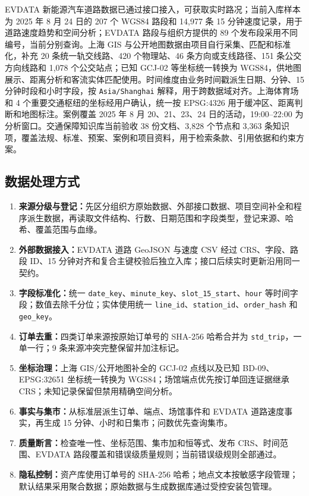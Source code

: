 \documentclass[a4paper,11pt]{article}
\newcommand{\code}[1]{\texttt{#1}}
\newcommand{\term}[1]{\textbf{#1}}
\begin{document}
EVDATA 新能源汽车道路数据已通过接口接入，可获取实时路况；当前入库样本为 2025 年 8 月 24 日的 207 个 WGS84 路段和 14,977 条 15 分钟速度记录，用于道路速度趋势和空间分析；EVDATA 路段与组织方提供的 89 个发布段采用不同编号，当前分别查询。上海 GIS 与公开地图数据由项目自行采集、匹配和标准化，补充 20 条统一轨交线路、420 个物理站、46 条方向或支线路径、151 条公交方向线路和 1,078 个公交站点；已知 GCJ-02 等坐标统一转换为 WGS84，供地图展示、距离分析和客流实体匹配使用。时间维度由业务时间戳派生日期、分钟、15 分钟时段和小时字段，按 \code{Asia/Shanghai} 解释，用于跨数据域对齐。上海体育场和 4 个重要交通枢纽的坐标经用户确认，统一按 EPSG:4326 用于缓冲区、距离判断和地图标注。案例覆盖 2025 年 8 月 20、21、23、24 日的活动，19:00--22:00 为分析窗口。交通保障知识库当前验收 38 份文档、3,828 个节点和 3,363 条知识项，覆盖法规、标准、预案、案例和项目资料，用于检索条款、引用依据和约束方案。

\subsection{数据处理方式}

\begin{enumerate}
  \item \term{来源分级与登记：}先区分组织方原始数据、外部接口数据、项目空间补全和程序派生数据，再读取文件结构、行数、日期范围和字段类型，登记来源、哈希、覆盖范围与血缘。
  \item \term{外部数据接入：}EVDATA 道路 GeoJSON 与速度 CSV 经过 CRS、字段、路段 ID、15 分钟对齐和复合主键校验后独立入库；接口后续实时更新沿用同一契约。
  \item \term{字段标准化：}统一 \code{date\_key}、\code{minute\_key}、\code{slot\_15\_start}、\code{hour} 等时间字段；数值去除千分位；实体使用统一 \code{line\_id}、\code{station\_id}、\code{order\_hash} 和 \code{geo\_key}。
  \item \term{订单去重：}四类订单来源按原始订单号的 SHA-256 哈希合并为 \code{std\_trip}，一单一行；9 条来源冲突完整保留并加注标记。
  \item \term{坐标治理：}上海 GIS/公开地图补全的 GCJ-02 点线以及已知 BD-09、EPSG:32651 坐标统一转换为 WGS84；场馆端点优先按订单回连证据继承 CRS；未知记录保留但禁用精确空间分析。
  \item \term{事实与集市：}从标准层派生订单、端点、场馆事件和 EVDATA 道路速度事实，再生成 15 分钟、小时和日集市；问数优先查询集市。
  \item \term{质量断言：}检查唯一性、坐标范围、集市加和恒等式、发布 CRS、时间范围、EVDATA 路段覆盖和错误级质量规则；当前错误级规则全部通过。
  \item \term{隐私控制：}资产库使用订单号的 SHA-256 哈希；地点文本按敏感字段管理；默认结果采用聚合数据；原始数据与生成数据库通过受控安装包管理。
\end{enumerate}
\end{document}
